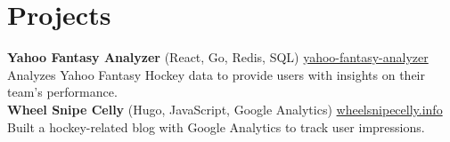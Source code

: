 \documentclass[11pt]{article}       %
\begin{document}
\vspace{-6.5pt}

\section*{Projects}

\textbf{Yahoo Fantasy Analyzer} (React, Go, Redis, SQL) \hfill \href{https://github.com/Mateuse/yahoo-fantasy-analyzer}{yahoo-fantasy-analyzer} \\
Analyzes Yahoo Fantasy Hockey data to provide users with insights on their team's performance. \\
\vspace{5pt}
\textbf{Wheel Snipe Celly} (Hugo, JavaScript, Google Analytics) \hfill \href{https://wheelsnipecelly.info}{wheelsnipecelly.info} \\
Built a hockey-related blog with Google Analytics to track user impressions.
\vspace{-18.5pt}
\end{document}
